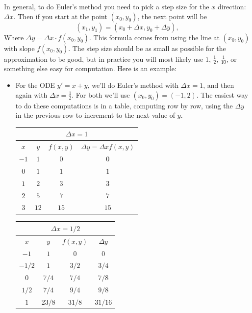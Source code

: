 In general, to do Euler's method you need to pick a step size for the $x$ direction: $\Delta x$. Then if you start at the point $(x_0, y_0)$, the next point will be
$$(x_1,y_1) = (x_0 + \Delta x, y_0 + \Delta y),$$
Where $\Delta y = \Delta x\cdot f(x_0, y_0)$. This formula comes from using the line at $(x_0, y_0)$ with slope $f(x_0, y_0)$.  The step size should be as small as possible for the approximation to be good, but in practice you will most likely use $1$, $\frac12$, $\frac1{10}$, or something else easy for computation. Here is an example:
\begin{itemize}[leftmargin=1em]
\item For the ODE $y'=x+y$, we'll do Euler's method with $\Delta x = 1$, and then again with $\Delta x = \frac{1}{2}$. For both we'll use $(x_0,y_0)=(-1,2)$. The easiest way to do these computations is in a table, computing row by row, using the $\Delta y$ in the previous row to increment to the next value of $y$.

\begin{multicols}{2}
\begin{center}
\def\arraystretch{1.2}
\begin{tabular}{@{}cccc@{}}
\multicolumn{4}{c}{$\Delta x = 1$}\\
\midrule[0.4mm]
$x$ & $y$ & $f(x,y)$ & $\Delta y = \Delta x f(x,y)$ \\
\midrule
$-1$ & $1$ & $0$ & $0$\\
$0$ & $1$ & $1$ & $1$\\
$1$ & $2$ & $3$ & $3$\\
$2$ & $5$ & $7$ & $7$\\
$3$ & $12$ & $15$ & $15$\\
\bottomrule[0.4mm]
\end{tabular}
\end{center}

\columnbreak

\begin{center}
\def\arraystretch{1.2}
\begin{tabular}{@{}cccc@{}}
\multicolumn{4}{c}{$\Delta x = 1/2$}\\
\midrule[0.4mm]
$x$ & $y$ & $f(x,y)$ & $\Delta y$ \\
\midrule
$-1$ & $1$ & $0$ & $0$\\
$-1/2$ & $1$ & $3/2$ & $3/4$\\
$0$ & $7/4$ & $7/4$ & $7/8$\\
$1/2$ & $7/4$ & $9/4$ & $9/8$\\
$1$ & $23/8$ & $31/8$ & $31/16$\\
\bottomrule[0.4mm]
\end{tabular}
\end{center}
\end{multicols}


\end{itemize}
